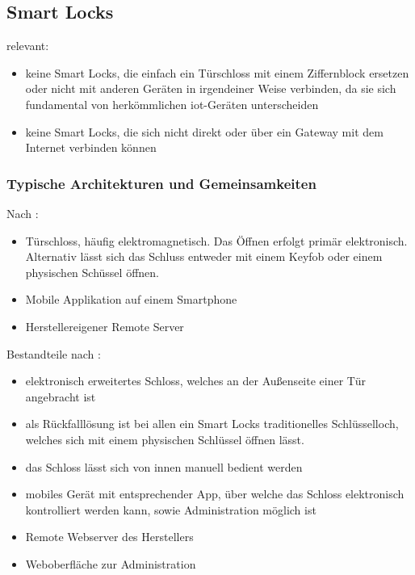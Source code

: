 \subsection{Smart Locks}
\label{sec:sota_smart_locks}

	relevant: \cite{Ye2017}\cite{Fuller2017}\cite{Rose2016}\cite{Ho2016}
	
	\begin{itemize}
	    \item keine Smart Locks, die einfach ein Türschloss mit einem Ziffernblock ersetzen oder nicht mit anderen Geräten in irgendeiner Weise verbinden, da sie sich fundamental von herkömmlichen \gls{iot}-Geräten unterscheiden\cite{Ho2016}
	    \item keine Smart Locks, die sich nicht direkt oder über ein Gateway mit dem Internet verbinden können\cite{Ho2016}
	\end{itemize}
	
	\subsubsection{Typische Architekturen und Gemeinsamkeiten}
	    Nach \citeauthor{Ye2017}:
		\begin{itemize}
			\item Türschloss, häufig elektromagnetisch. Das Öffnen erfolgt primär elektronisch. Alternativ lässt sich das Schluss entweder mit einem Keyfob oder einem physischen Schüssel öffnen.
			\item Mobile Applikation auf einem Smartphone
			\item Herstellereigener Remote Server
		\end{itemize}

		Bestandteile nach \citeauthor{Ho2016}:
		\begin{itemize}
		    \item elektronisch erweitertes Schloss, welches an der Außenseite einer Tür angebracht ist
		    \item als Rückfalllösung ist bei allen ein Smart Locks traditionelles Schlüsselloch, welches sich mit einem physischen Schlüssel öffnen lässt.
		    \item das Schloss lässt sich von innen manuell bedient werden
		    \item mobiles Gerät mit entsprechender App, über welche das Schloss elektronisch kontrolliert werden kann, sowie Administration möglich ist
		    \item Remote Webserver des Herstellers
		    \item Weboberfläche zur Administration
		\end{itemize}

